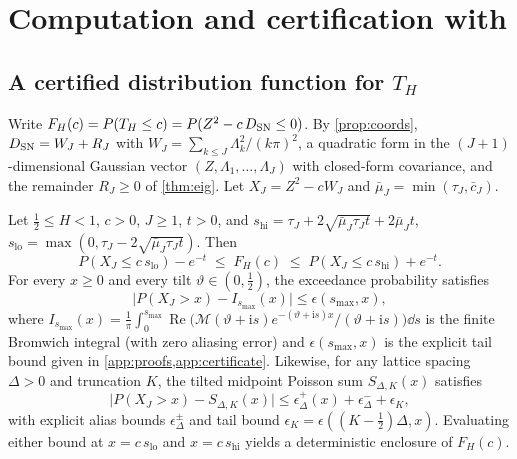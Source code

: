 \section{Computation and certification with \CosCert}\label{sec:computation}

\subsection{A certified distribution function for \texorpdfstring{$T_H$}{T\_H}}
Write $F_H(c)=P(T_H\le c)=P(Z^2-c\,D_{\mathrm{SN}}\le0)$. By \cref{prop:coords}, $D_{\mathrm{SN}}=W_J+R_J$ with
$W_J=\sum_{k\le J}\Lambda_k^2/(k\pi)^2$, a quadratic form in the $(J+1)$-dimensional Gaussian vector
$(Z,\Lambda_1,\dots,\Lambda_J)$ with closed-form covariance, and the remainder $R_J\ge0$ of \cref{thm:eig}. Let
$X_J=Z^2-cW_J$ and $\bar\mu_J=\min(\tau_J,\bar c_J)$.

\begin{theorem}\label{thm:certificate}
Let $\frac12\le H<1$, $c>0$, $J\ge1$, $t>0$, and
$s_{\mathrm{hi}}=\tau_J+2\sqrt{\bar\mu_J\tau_Jt}+2\bar\mu_Jt$, $s_{\mathrm{lo}}=\max(0,\tau_J-2\sqrt{\bar\mu_J\tau_Jt})$. Then
\[P(X_J\le c\,s_{\mathrm{lo}})-e^{-t}\;\le\;F_H(c)\;\le\;P(X_J\le c\,s_{\mathrm{hi}})+e^{-t}.\]
For every $x\ge0$ and every tilt $\vartheta\in(0,\frac12)$, the exceedance probability satisfies
\[\big|P(X_J>x)-I_{s_{\max}}(x)\big|\le\epsilon(s_{\max},x),\]
where $I_{s_{\max}}(x)=\frac1\pi\int_0^{s_{\max}}\operatorname{Re}\!\big(\mathcal M(\vartheta+\mathrm is)e^{-(\vartheta+\mathrm is)x}/(\vartheta+\mathrm is)\big)\dd s$
is the finite Bromwich integral (with zero aliasing error) and $\epsilon(s_{\max},x)$ is the explicit tail bound given
in \cref{app:proofs,app:certificate}. Likewise, for any lattice spacing $\Delta>0$ and truncation $K$, the tilted
midpoint Poisson sum $S_{\Delta,K}(x)$ satisfies
\[\big|P(X_J>x)-S_{\Delta,K}(x)\big|\le\epsilon_\Delta^+(x)+\epsilon_\Delta^-+\epsilon_K,\]
with explicit alias bounds $\epsilon_\Delta^\pm$ and tail bound $\epsilon_K=\epsilon((K-\frac12)\Delta,x)$. Evaluating
either bound at $x=c\,s_{\mathrm{lo}}$ and $x=c\,s_{\mathrm{hi}}$ yields a deterministic enclosure of $F_H(c)$.
\end{theorem}

